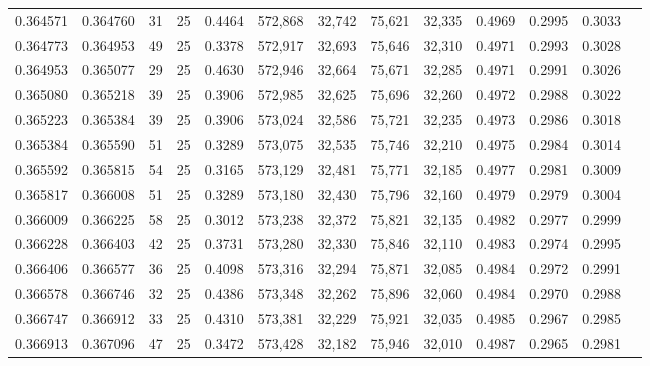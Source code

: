 \begin{tabular}{rrrrrrrrrrrrr}
0.364571 & 0.364760 &    31 &  25 &                                     0.4464 & 572,868 &  32,742 &  75,621 &  32,335 & 0.4969 & 0.2995 & 0.3033 \\
0.364773 & 0.364953 &    49 &  25 &                                     0.3378 & 572,917 &  32,693 &  75,646 &  32,310 & 0.4971 & 0.2993 & 0.3028 \\
0.364953 & 0.365077 &    29 &  25 &                                     0.4630 & 572,946 &  32,664 &  75,671 &  32,285 & 0.4971 & 0.2991 & 0.3026 \\
0.365080 & 0.365218 &    39 &  25 &                                     0.3906 & 572,985 &  32,625 &  75,696 &  32,260 & 0.4972 & 0.2988 & 0.3022 \\
0.365223 & 0.365384 &    39 &  25 &                                     0.3906 & 573,024 &  32,586 &  75,721 &  32,235 & 0.4973 & 0.2986 & 0.3018 \\
0.365384 & 0.365590 &    51 &  25 &                                     0.3289 & 573,075 &  32,535 &  75,746 &  32,210 & 0.4975 & 0.2984 & 0.3014 \\
0.365592 & 0.365815 &    54 &  25 &                                     0.3165 & 573,129 &  32,481 &  75,771 &  32,185 & 0.4977 & 0.2981 & 0.3009 \\
0.365817 & 0.366008 &    51 &  25 &                                     0.3289 & 573,180 &  32,430 &  75,796 &  32,160 & 0.4979 & 0.2979 & 0.3004 \\
0.366009 & 0.366225 &    58 &  25 &                                     0.3012 & 573,238 &  32,372 &  75,821 &  32,135 & 0.4982 & 0.2977 & 0.2999 \\
0.366228 & 0.366403 &    42 &  25 &                                     0.3731 & 573,280 &  32,330 &  75,846 &  32,110 & 0.4983 & 0.2974 & 0.2995 \\
0.366406 & 0.366577 &    36 &  25 &                                     0.4098 & 573,316 &  32,294 &  75,871 &  32,085 & 0.4984 & 0.2972 & 0.2991 \\
0.366578 & 0.366746 &    32 &  25 &                                     0.4386 & 573,348 &  32,262 &  75,896 &  32,060 & 0.4984 & 0.2970 & 0.2988 \\
0.366747 & 0.366912 &    33 &  25 &                                     0.4310 & 573,381 &  32,229 &  75,921 &  32,035 & 0.4985 & 0.2967 & 0.2985 \\
0.366913 & 0.367096 &    47 &  25 &                                     0.3472 & 573,428 &  32,182 &  75,946 &  32,010 & 0.4987 & 0.2965 & 0.2981 \\

\end{tabular}

